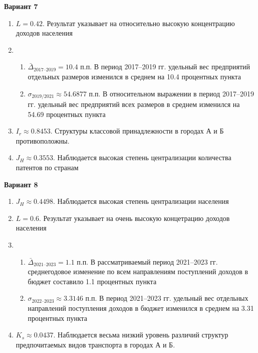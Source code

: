\documentclass{article}
\begin{document}
\textbf{Вариант 7}
\begin{enumerate}
\item $L= 0.42$. Результат указывает на относительно высокую концентрацию доходов населения
\item \begin{enumerate} \item $\bar\Delta_\text{2017--2019}= 10.4$ п.п. В период 2017--2019 гг. удельный вес предприятий отдельных размеров изменился в среднем на 10.4 процентных пункта
\item $\sigma_\text{2019/2021}\approx 54.6877$ п.п. В относительном выражении в период 2017--2019 гг. удельный вес предприятий всех размеров в среднем изменился на 54.69 процентных пункта\end{enumerate}
\item $I_r\approx 0.8453$. Структуры классовой принадлежности в городах А и Б противоположны.
\item $J_H \approx 0.3553$. Наблюдается высокая степень централизации количества патентов по странам
\end{enumerate}

\textbf{Вариант 8}
\begin{enumerate}
\item $J_H \approx 0.4498$. Наблюдается высокая степень централизации населения
\item $L= 0.6$. Результат указывает на очень высокую концетрацию доходов населения
\item \begin{enumerate} \item $\bar\Delta_\text{2021--2023}= 1.1$ п.п. В рассматриваемый период 2021--2023 гг. среднегодовое изменение по всем направлениям поступлений доходов в бюджет составило 1.1 процентных пункта
\item $\sigma_\text{2022--2023}\approx 3.3146$ п.п. В период 2021--2023 гг. удельный вес отдельных направлений поступления доходов в бюджет изменился в среднем на 3.31 процентных пункта\end{enumerate}
\item $K_s\approx 0.0437$. Наблюдается весьма низкий уровень различий структур предпочитаемых видов транспорта в городах А и Б.
\end{enumerate}
\end{document}
